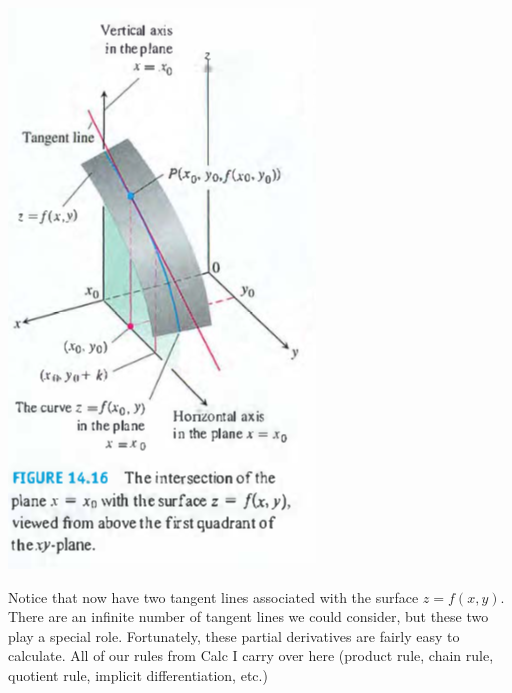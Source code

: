 \documentclass[12pt, letter]{article}
\theoremstyle{plain}
\numberwithin{theorem}{section}
\theoremstyle{definition}
\begin{document}
\begin{center}
\includegraphics[scale=0.7]{m2_f4}
\end{center}

\bigskip

Notice that now have two tangent lines associated with the surface $z=f(x,y)$. There are an infinite number of tangent lines we could consider, but these two play a special role. Fortunately, these partial derivatives are fairly easy to calculate. All of our rules from Calc I carry over here (product rule, chain rule, quotient rule, implicit differentiation, etc.)

\bigskip

\hrulefill

\bigskip
\end{document}
